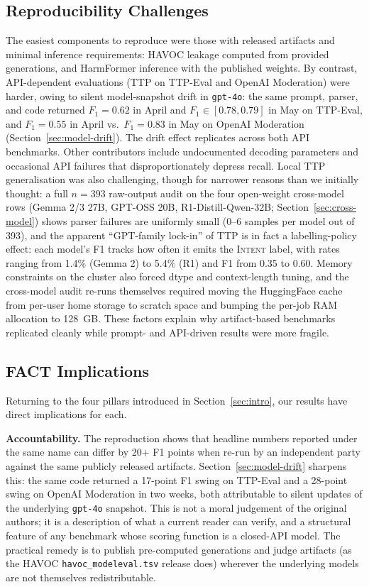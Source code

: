 \documentclass[10pt]{article} %
\begin{document}
\subsection{Reproducibility Challenges}
The easiest components to reproduce were those with released artifacts and minimal inference requirements: HAVOC leakage computed from provided generations, and HarmFormer inference with the published weights. By contrast, API-dependent evaluations (TTP on TTP-Eval and OpenAI Moderation) were harder, owing to silent model-snapshot drift in \texttt{gpt-4o}: the same prompt, parser, and code returned $F_1=0.62$ in April and $F_1\in[0.78, 0.79]$ in May on TTP-Eval, and $F_1=0.55$ in April vs.\ $F_1=0.83$ in May on OpenAI Moderation (Section~\ref{sec:model-drift}). The drift effect replicates across both API benchmarks. Other contributors include undocumented decoding parameters and occasional API failures that disproportionately depress recall. Local TTP generalisation was also challenging, though for narrower reasons than we initially thought: a full $n=393$ raw-output audit on the four open-weight cross-model rows (Gemma 2/3 27B, GPT-OSS 20B, R1-Distill-Qwen-32B; Section~\ref{sec:cross-model}) shows parser failures are uniformly small (0--6 samples per model out of 393), and the apparent ``GPT-family lock-in'' of TTP is in fact a labelling-policy effect: each model's F1 tracks how often it emits the \textsc{Intent} label, with rates ranging from 1.4\% (Gemma 2) to 5.4\% (R1) and F1 from 0.35 to 0.60. Memory constraints on the cluster also forced dtype and context-length tuning, and the cross-model audit re-runs themselves required moving the HuggingFace cache from per-user home storage to scratch space and bumping the per-job RAM allocation to 128~GB. These factors explain why artifact-based benchmarks replicated cleanly while prompt- and API-driven results were more fragile.

\subsection{FACT Implications}

Returning to the four pillars introduced in Section~\ref{sec:intro}, our results have direct implications for each.

\textbf{Accountability.} The reproduction shows that headline numbers reported under the same name can differ by 20+ F1 points when re-run by an independent party against the same publicly released artifacts. Section~\ref{sec:model-drift} sharpens this: the same code returned a 17-point F1 swing on TTP-Eval and a 28-point swing on OpenAI Moderation in two weeks, both attributable to silent updates of the underlying \texttt{gpt-4o} snapshot. This is not a moral judgement of the original authors; it is a description of what a current reader can verify, and a structural feature of any benchmark whose scoring function is a closed-API model. The practical remedy is to publish pre-computed generations and judge artifacts (as the HAVOC \texttt{havoc\_modeleval.tsv} release does) wherever the underlying models are not themselves redistributable.
\end{document}
